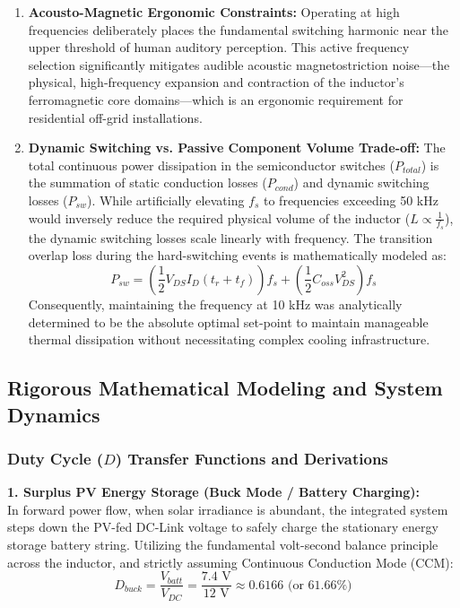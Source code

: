 \begin{enumerate}
    \item \textbf{Acousto-Magnetic Ergonomic Constraints:} Operating at high frequencies deliberately places the fundamental switching harmonic near the upper threshold of human auditory perception. This active frequency selection significantly mitigates audible acoustic magnetostriction noise—the physical, high-frequency expansion and contraction of the inductor's ferromagnetic core domains—which is an ergonomic requirement for residential off-grid installations.
    
    \item \textbf{Dynamic Switching vs. Passive Component Volume Trade-off:} The total continuous power dissipation in the semiconductor switches ($P_{total}$) is the summation of static conduction losses ($P_{cond}$) and dynamic switching losses ($P_{sw}$). While artificially elevating $f_s$ to frequencies exceeding 50 kHz would inversely reduce the required physical volume of the inductor ($L \propto \frac{1}{f_s}$), the dynamic switching losses scale linearly with frequency. The transition overlap loss during the hard-switching events is mathematically modeled as:
    \begin{equation}
        P_{sw} = \left( \frac{1}{2} V_{DS} I_D (t_{r} + t_{f}) \right) f_s + \left( \frac{1}{2} C_{oss} V_{DS}^2 \right) f_s
        \label{eq:p_sw}
    \end{equation}
    Consequently, maintaining the frequency at 10 kHz was analytically determined to be the absolute optimal set-point to maintain manageable thermal dissipation without necessitating complex cooling infrastructure.
\end{enumerate}

\subsection{Rigorous Mathematical Modeling and System Dynamics}

\subsubsection{Duty Cycle ($D$) Transfer Functions and Derivations}

\textbf{1. Surplus PV Energy Storage (Buck Mode / Battery Charging):}\\
In forward power flow, when solar irradiance is abundant, the integrated system steps down the PV-fed DC-Link voltage to safely charge the stationary energy storage battery string. Utilizing the fundamental volt-second balance principle across the inductor, and strictly assuming Continuous Conduction Mode (CCM):
\begin{equation}
    D_{buck} = \frac{V_{batt}}{V_{DC}} = \frac{7.4\text{ V}}{12\text{ V}} \approx 0.6166 \text{ (or } 61.66\% \text{)}
    \label{eq:d_buck}
\end{equation}

